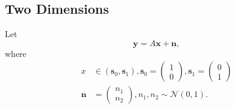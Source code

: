 \documentclass[journal,10pt,twocolumn]{IEEEtran}
\numberwithin{equation}{subsection}
\numberwithin{figure}{subsection}
\providecommand{\mbf}{\mathbf}
\providecommand{\brak}[1]{\ensuremath{\left(#1\right)}}
\providecommand{\gauss}[2]{\mathcal{N}\ensuremath{\left(#1,#2\right)}}
\begin{document}
\subsection{\textbf{Two Dimensions}}
Let 
\begin{equation*}
\mbf{y} = A\mbf{x} + \mbf{n},
\end{equation*}
where 
\begin{align*}
x &\in \brak{\mbf{s}_0,\mbf{s}_1}, 
\mbf{s}_0 = 
\begin{pmatrix}
1 
\\
0
\end{pmatrix},
\mbf{s}_1 = 
\begin{pmatrix}
0 
\\
1
\end{pmatrix}
\\
\mbf{n} &= 
\begin{pmatrix}
n_1
\\
n_2
\end{pmatrix},
n_1,n_2 \sim \gauss{0}{1}.
\end{align*}
\end{document}
